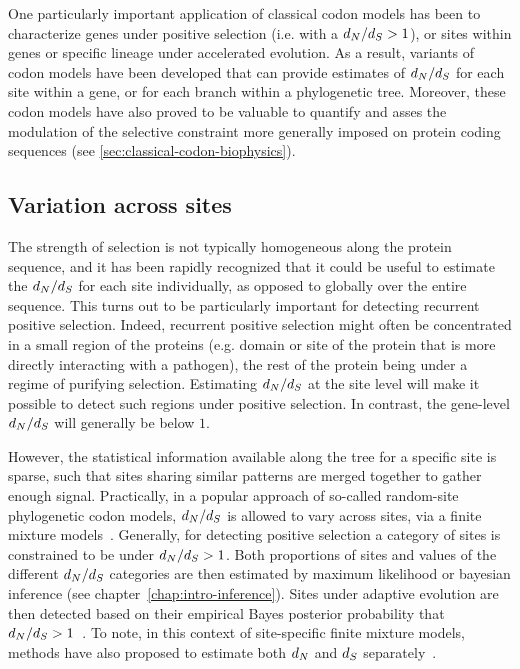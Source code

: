 One particularly important application of classical codon models has been to characterize genes under positive selection (i.e. with a $d_N / d_S > 1$), or sites within genes or specific lineage under accelerated evolution.
As a result, variants of codon models have been developed that can provide estimates of $d_N / d_S$ for each site within a gene, or for each branch within a phylogenetic tree.
Moreover, these codon models have also proved to be valuable to quantify and asses the modulation of the selective constraint more generally imposed on protein coding sequences (see \ref{sec:classical-codon-biophysics}).

\subsection{Variation across sites}
\label{subsec:variation-across-sites}

The strength of selection is not typically homogeneous along the protein sequence, and it has been rapidly recognized that it could be useful to estimate the $d_N / d_S$ for each site individually, as opposed to globally over the entire sequence.
This turns out to be particularly important for detecting recurrent positive selection.
Indeed, recurrent positive selection might often be concentrated in a small region of the proteins (e.g. domain or site of the protein that is more directly interacting with a pathogen), the rest of the protein being under a regime of purifying selection.
Estimating $d_N / d_S$ at the site level will make it possible to detect such regions under positive selection.
In contrast, the gene-level $d_N / d_S$ will generally be below $1$.

However, the statistical information available along the tree for a specific site is sparse, such that sites sharing similar patterns are merged together to gather enough signal.
Practically, in a popular approach of so-called random-site phylogenetic \gls{codon} models, $d_N / d_S$ is allowed to vary across sites, via a finite mixture models~\citep{Nielsen1998, Yang2000, Yang2005, Huelsenbeck2006}.
Generally, for detecting positive selection a category of sites is constrained to be under $d_N / d_S > 1$.
Both proportions of sites and values of the different $d_N / d_S$ categories are then estimated by maximum likelihood or bayesian inference (see chapter~\ref{chap:intro-inference}).
Sites under adaptive evolution are then detected based on their empirical Bayes posterior probability that $d_N / d_S > 1$~\citep{Huelsenbeck2004,Yang2005}.
To note, in this context of site-specific finite mixture models, methods have also proposed to estimate both $d_N$ and $d_S$ separately~\citep{Pond2005a, Spielman2016}.

